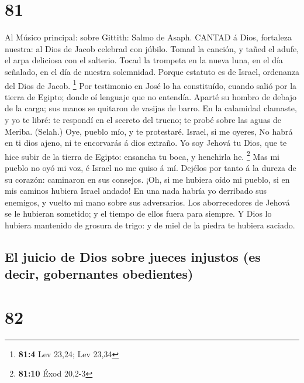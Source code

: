 \hypertarget{section-80}{%
\section{81}\label{section-80}}

 Al Músico principal: sobre Gittith: Salmo de Asaph. CANTAD
á Dios, fortaleza nuestra: al Dios de Jacob celebrad con júbilo.
 Tomad la canción, y tañed el adufe, el arpa deliciosa con
el salterio.  Tocad la trompeta en la nueva luna, en el día
señalado, en el día de nuestra solemnidad.  Porque estatuto
es de Israel, ordenanza del Dios de Jacob. \footnote{\textbf{81:4} Lev
  23,24; Lev 23,34}  Por testimonio en José lo ha
constituído, cuando salió por la tierra de Egipto; donde oí lenguaje que
no entendía.  Aparté su hombro de debajo de la carga; sus
manos se quitaron de vasijas de barro.  En la calamidad
clamaste, y yo te libré: te respondí en el secreto del trueno; te probé
sobre las aguas de Meriba. (Selah.)  Oye, pueblo mío, y te
protestaré. Israel, si me oyeres,  No habrá en ti dios
ajeno, ni te encorvarás á dios extraño.  Yo soy Jehová tu
Dios, que te hice subir de la tierra de Egipto: ensancha tu boca, y
henchirla he. \footnote{\textbf{81:10} Éxod 20,2-3}  Mas mi
pueblo no oyó mi voz, é Israel no me quiso á mí.  Dejélos
por tanto á la dureza de su corazón: caminaron en sus consejos.
 ¡Oh, si me hubiera oído mi pueblo, si en mis caminos
hubiera Israel andado!  En una nada habría yo derribado sus
enemigos, y vuelto mi mano sobre sus adversarios.  Los
aborrecedores de Jehová se le hubieran sometido; y el tiempo de ellos
fuera para siempre.  Y Dios lo hubiera mantenido de grosura
de trigo: y de miel de la piedra te hubiera saciado.

\hypertarget{el-juicio-de-dios-sobre-jueces-injustos-es-decir-gobernantes-obedientes}{%
\subsection{El juicio de Dios sobre jueces injustos (es decir,
gobernantes
obedientes)}\label{el-juicio-de-dios-sobre-jueces-injustos-es-decir-gobernantes-obedientes}}

\hypertarget{section-81}{%
\section{82}\label{section-81}}

